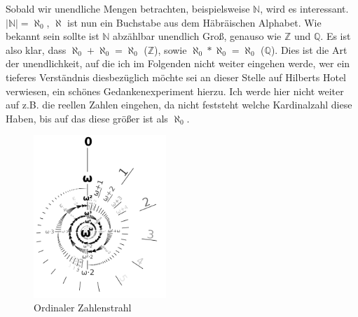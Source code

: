 \documentclass{scrartcl}
\begin{document}
Sobald wir unendliche Mengen betrachten, beispielsweise $\mathbb{N}$, wird es interessant.
$|\mathbb{N}| = \aleph_0$, $\aleph$ ist nun ein Buchstabe aus dem Häbräischen
Alphabet. Wie bekannt sein sollte ist $\mathbb{N}$ abzählbar unendlich Groß,
genauso wie $\mathbb{Z}$ und $\mathbb{Q}$. Es ist also klar, dass $\aleph_0 +
\aleph_0 = \aleph_0$ ($\mathbb{Z}$), sowie $\aleph_0 * \aleph_0 = \aleph_0$
($\mathbb{Q}$). Dies ist die Art der unendlichkeit, auf die ich im Folgenden
nicht weiter eingehen werde, wer ein tieferes Verständnis diesbezüglich möchte
sei an dieser Stelle auf Hilberts Hotel verwiesen, ein schönes
Gedankenexperiment hierzu. Ich werde hier nicht
weiter auf z.B. die reellen Zahlen eingehen, da nicht feststeht welche
Kardinalzahl diese Haben, bis auf das diese größer ist als $\aleph_0$.



\begin{figure}
    \centering
    \includegraphics[width=5cm]{ordinal.png}
    \caption{\label{fig:ordinal.png}Ordinaler Zahlenstrahl}
\end{figure}
\end{document}
